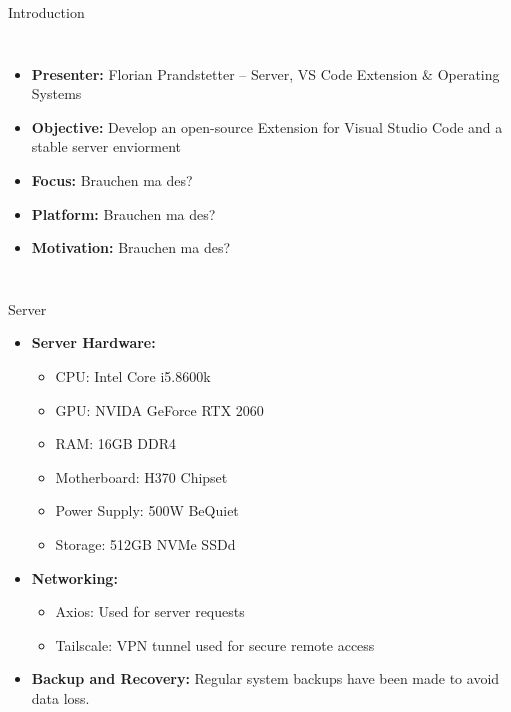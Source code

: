 \documentclass{beamer}
\begin{document}
\begin{frame}{Introduction}
  \begin{columns}
      \begin{itemize}
        \item \textbf{Presenter:} Florian Prandstetter – Server, VS Code Extension \& Operating Systems
        \item \textbf{Objective:} Develop an open-source Extension for Visual Studio Code and a stable server enviorment
        \item \textbf{Focus:} Brauchen ma des?
        \item \textbf{Platform:} Brauchen ma des?
        \item \textbf{Motivation:} Brauchen ma des?
      \end{itemize}
      \centering
  \end{columns}
\end{frame}



\begin{frame}{Server}
  \begin{itemize}
    \item \textbf{Server Hardware:}
      \begin{itemize}
        \item CPU: Intel Core i5.8600k
        \item GPU: NVIDA GeForce RTX 2060
        \item RAM: 16GB DDR4 
        \item Motherboard: H370 Chipset
        \item Power Supply: 500W BeQuiet
        \item Storage: 512GB NVMe SSDd
      \end{itemize}
    \item \textbf{Networking:}
      \begin{itemize}
        \item Axios: Used for server requests 
        \item Tailscale: VPN tunnel used for secure remote access 
      \end{itemize}
    \item \textbf{Backup and Recovery:} Regular system backups have been made to avoid data loss.      
  \end{itemize}
\end{frame}
\end{document}
